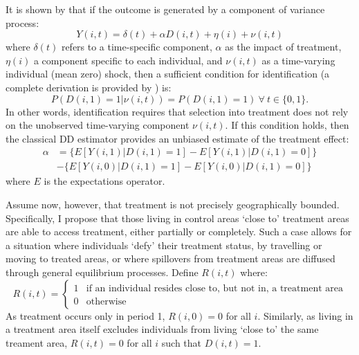 It is shown by \citet{AshenfelterCard1985} that if the outcome is generated by
a component of variance process:
\begin{equation}
\label{Seqn:COV}
Y(i,t)=\delta(t) + \alpha D(i,t)+\eta(i)+\nu(i,t)
\end{equation}
where $\delta(t)$ refers to a time-specific component, $\alpha$ as the impact of 
treatment, $\eta(i)$ a component specific to each individual, and $\nu(i,t)$ as 
a time-varying individual (mean zero) shock, then a sufficient condition for 
identification (a complete derivation is provided by \citet{Abadie2005}) is:
\begin{equation}
\label{Seqn:ID}
P(D(i,1)=1|\nu(i,t))=P(D(i,1)=1) \ \forall\ t\in\{0,1\}.
\end{equation}
In other words, identification requires that selection into treatment does not
rely on the unobserved time-varying component $\nu(i,t)$.  If this condition 
holds, then the classical DD estimator provides an unbiased estimate of the
treatment effect:
\begin{equation}
\label{Seqn:DD}
\begin{split}
\alpha&=\{E[Y(i,1)|D(i,1)=1]-E[Y(i,1)|D(i,1)=0]\} \\
      &-\{E[Y(i,0)|D(i,1)=1]-E[Y(i,0)|D(i,1)=0]\}
\end{split}
\end{equation}
where $E$ is the expectations operator.

Assume now, however, that treatment is not precisely geographically bounded.  
Specifically, I propose that those living in control areas `close to' treatment 
areas are able to access treatment, either partially or completely.  Such a 
case allows for a situation where individuals `defy' their treatment status, by 
travelling or moving to treated areas, or where spillovers from treatment 
areas are diffused through general equilibrium processes.  Define $R(i,t)$ 
where:
\begin{equation}
\nonumber
 R(i,t) =
  \begin{cases}
   1  & \text{if an individual resides close to, but not in, a treatment area} \\
   0  & \text{otherwise} 
  \end{cases}
\end{equation}
As treatment occurs only in period 1, $R(i,0)=0$ for all $i$.  Similarly, as 
living in a treatment area itself excludes individuals from living `close to' 
the same treament area, $R(i,t)=0$ for all $i$ such that $D(i,t)=1$.

